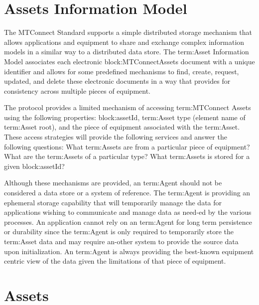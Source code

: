 
\section{Assets Information Model}
\label{sec:Assets Information Model}
The MTConnect Standard supports a simple distributed storage mechanism that allows applications and equipment to share and exchange complex information models in a similar way to a distributed data store.  The {term:Asset Information Model} associates each electronic {block:MTConnectAssets} document with a unique identifier and allows for some predefined mechanisms to find, create, request, updated, and delete these electronic documents in a way that provides for consistency across multiple pieces of equipment.

The protocol provides a limited mechanism of accessing {term:MTConnect Assets} using the following properties: {block:assetId}, {term:Asset} type (element name of {term:Asset} root), and the piece of equipment associated with the {term:Asset}.  These access strategies will provide the following services and answer the following questions: What {term:Assets} are from a particular piece of equipment?  What are the {term:Assets} of a particular type? What {term:Assets} is stored for a given {block:assetId}?

Although these mechanisms are provided, an {term:Agent} should not be considered a data store or a system of reference.  The {term:Agent} is providing an ephemeral storage capability that will temporarily manage the data for applications wishing to communicate and manage data as need-ed by the various processes.  An application cannot rely on an {term:Agent} for long term persistence or durability since the {term:Agent} is only required to temporarily store the {term:Asset} data and may require an-other system to provide the source data upon initialization.  An {term:Agent} is always providing the best-known equipment centric view of the data given the limitations of that piece of equipment.

\section{Assets}
\label{sec:Assets}




